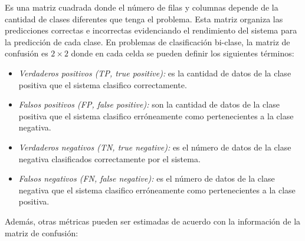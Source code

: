 \documentclass[10pt, a4paper]{article}
\begin{document}
Es una matriz cuadrada donde el número de filas y columnas depende de la cantidad de clases 
diferentes que tenga el problema. Esta matriz organiza las predicciones correctas e incorrectas 
evidenciando el rendimiento del sistema para la predicción de cada clase. En problemas de 
clasificación bi-clase, la matriz de confusión es $2 \times 2$ donde en cada celda se pueden 
definir los siguientes términos:

\begin{itemize}
    \item \textit{Verdaderos positivos (TP, true positive):} es la cantidad de datos de la clase positiva que el sistema clasifico correctamente.

    \item \textit{Falsos positivos (FP, false positive):} son la cantidad de datos de la clase positiva que el sistema clasifico erróneamente como pertenecientes a la clase negativa.

    \item \textit{Verdaderos negativos (TN, true negative):} es el número de datos de la clase negativa clasificados correctamente por el sistema.

    \item \textit{Falsos negativos (FN, false negative):} es el número de datos de la clase negativa que el sistema clasifico erróneamente como pertenecientes a la clase positiva.
    
\end{itemize}

Además, otras métricas pueden ser estimadas de acuerdo con la información de la matriz de confusión:
\end{document}
